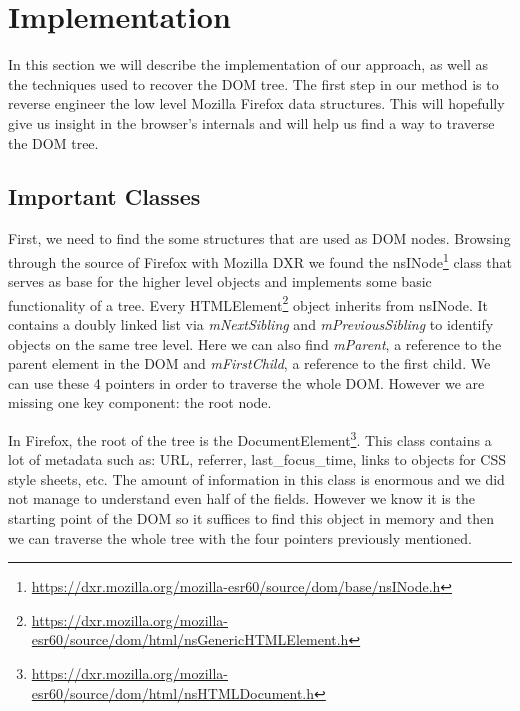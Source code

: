 \section{Implementation}
\label{sec:implementation}

In this section we will describe the implementation of our approach,
as well as the techniques used to recover the DOM tree. The first step
in our method is to reverse engineer the low level Mozilla Firefox
data structures. This will hopefully give us insight in the browser's
internals and will help us find a way to traverse the DOM tree.

\subsection{Important Classes}
First, we need to find the some structures that are used as DOM
nodes. Browsing through the source of Firefox with Mozilla
DXR\cite{dxrmozilla} we found the
nsINode\footnote{\url{https://dxr.mozilla.org/mozilla-esr60/source/dom/base/nsINode.h}}
class that serves as base for the higher level objects and implements
some basic functionality of a tree. Every
HTMLElement\footnote{\url{https://dxr.mozilla.org/mozilla-esr60/source/dom/html/nsGenericHTMLElement.h}}
object inherits from nsINode. It contains a doubly linked list via
\textit{mNextSibling} and \textit{mPreviousSibling} to identify
objects on the same tree level. Here we can also find
\textit{mParent}, a reference to the parent element in the DOM and
\textit{mFirstChild}, a reference to the first child. We can use these
4 pointers in order to traverse the whole DOM. However we are missing
one key component: the root node.

In Firefox, the root of the tree is the
DocumentElement\footnote{\url{https://dxr.mozilla.org/mozilla-esr60/source/dom/html/nsHTMLDocument.h}}. This
class contains a lot of metadata such as: URL, referrer,
last\_focus\_time, links to objects for CSS style sheets, etc. The
amount of information in this class is enormous and we did not manage
to understand even half of the fields. However we know it is the
starting point of the DOM so it suffices to find this object in memory
and then we can traverse the whole tree with the four pointers
previously mentioned.

